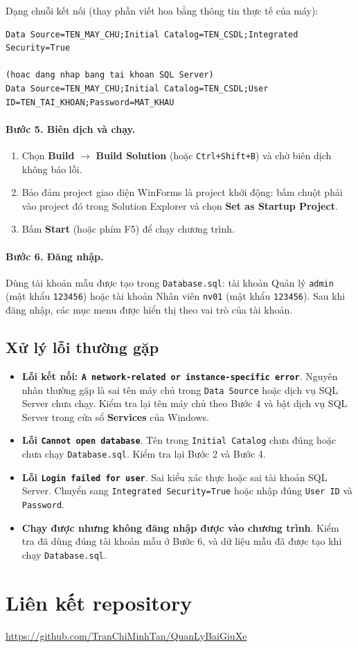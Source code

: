 Dạng chuỗi kết nối (thay phần viết hoa bằng thông tin thực tế của máy):
 
\begin{lstlisting}[language={},numbers=none]
Data Source=TEN_MAY_CHU;Initial Catalog=TEN_CSDL;Integrated Security=True
 
(hoac dang nhap bang tai khoan SQL Server)
Data Source=TEN_MAY_CHU;Initial Catalog=TEN_CSDL;User ID=TEN_TAI_KHOAN;Password=MAT_KHAU
\end{lstlisting}
 
\paragraph{Bước 5. Biên dịch và chạy.}
\begin{enumerate}
  \item Chọn \textbf{Build} $\rightarrow$ \textbf{Build Solution} (hoặc \texttt{Ctrl+Shift+B}) và chờ biên dịch không báo lỗi.
  \item Bảo đảm project giao diện WinForms là project khởi động: bấm chuột phải vào project đó trong Solution Explorer và chọn \textbf{Set as Startup Project}.
  \item Bấm \textbf{Start} (hoặc phím F5) để chạy chương trình.
\end{enumerate}
 
\paragraph{Bước 6. Đăng nhập.} Dùng tài khoản mẫu được tạo trong \texttt{Database.sql}: tài khoản Quản lý \texttt{admin} (mật khẩu \texttt{123456}) hoặc tài khoản Nhân viên \texttt{nv01} (mật khẩu \texttt{123456}). Sau khi đăng nhập, các mục menu được hiển thị theo vai trò của tài khoản.
 
\subsection{Xử lý lỗi thường gặp}
 
\begin{itemize}
  \item \textbf{Lỗi kết nối: \texttt{A network-related or instance-specific error}}. Nguyên nhân thường gặp là sai tên máy chủ trong \texttt{Data Source} hoặc dịch vụ SQL Server chưa chạy. Kiểm tra lại tên máy chủ theo Bước 4 và bật dịch vụ SQL Server trong cửa sổ \textbf{Services} của Windows.
  \item \textbf{Lỗi \texttt{Cannot open database}}. Tên trong \texttt{Initial Catalog} chưa đúng hoặc chưa chạy \texttt{Database.sql}. Kiểm tra lại Bước 2 và Bước 4.
  \item \textbf{Lỗi \texttt{Login failed for user}}. Sai kiểu xác thực hoặc sai tài khoản SQL Server. Chuyển sang \texttt{Integrated Security=True} hoặc nhập đúng \texttt{User ID} và \texttt{Password}.
  \item \textbf{Chạy được nhưng không đăng nhập được vào chương trình}. Kiểm tra đã dùng đúng tài khoản mẫu ở Bước 6, và dữ liệu mẫu đã được tạo khi chạy \texttt{Database.sql}.
\end{itemize}
 

\section{Liên kết repository}
\url{https://github.com/TranChiMinhTan/QuanLyBaiGiuXe}